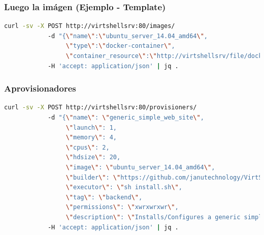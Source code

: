 \documentclass[xcolor=dvipsnames,table]{beamer} %
\begin{document}
\begin{frame}[fragile]
	\frametitle{Luego la imágen (Ejemplo - Template)}
	\begin{lstlisting}[language=Bash,basicstyle=\ttfamily\scriptsize,keywordstyle=\color{blue}]
		curl -sv -X POST http://virtshellsrv:80/images/ 
		    -d "{\"name\":\"ubuntu_server_14.04_amd64\",
		         \"type\":\"docker-container\",
		         \"container_resource\":\"http://virtshellsrv/file/dockerfile_ubuntu_server_14.04\"}" 
		    -H 'accept: application/json' | jq .
	\end{lstlisting}
\end{frame}


\begin{frame}[fragile]
	\frametitle{Aprovisionadores}
	\begin{lstlisting}[language=Bash,basicstyle=\ttfamily\scriptsize,keywordstyle=\color{blue}]
		curl -sv -X POST http://virtshellsrv:80/provisioners/ 
		    -d "{\"name\": \"generic_simple_web_site\", 
		         \"launch\": 1, 
		         \"memory\": 4, 
		         \"cpus\": 2, 
		         \"hdsize\": 20, 
		         \"image\": \"ubuntu_server_14.04_amd64\", 
		         \"builder\": \"https://github.com/janutechnology/VirtShell_Generic_Provisioner_Simple_WebSite_Example.git\", 
		         \"executor\": \"sh install.sh\", 
		         \"tag\": \"backend\", 
		         \"permissions\": \"xwrxwrxwr\", 
		         \"description\": \"Installs/Configures a generic simple web site\"}"  
		    -H 'accept: application/json' | jq .
	\end{lstlisting}
\end{frame}
\end{document}
